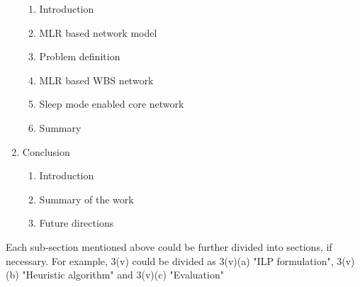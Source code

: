 \documentclass{article}
\begin{document}
\begin{enumerate}
\begin{enumerate}[i]
\item Introduction
\item MLR based network model
\item Problem definition
\item MLR based WBS network
\item Sleep mode enabled core network
\item Summary
\end{enumerate}
\item Conclusion
\begin{enumerate}[i]
\item Introduction
\item Summary of the work
\item Future directions
\end{enumerate}
\end{enumerate}
Each sub-section mentioned above could be further divided into sections, if necessary. For example, 3(v) could be divided as 3(v)(a) "ILP formulation", 3(v)(b) "Heuristic algorithm" and 3(v)(c) "Evaluation"
\newpage
\centering
\vspace*{2.5in}
\end{document}
